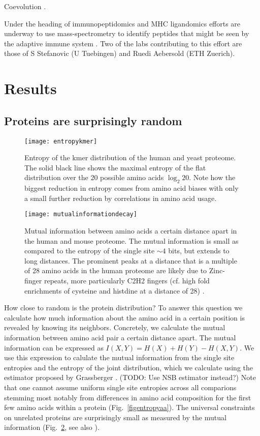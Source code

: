\documentclass[superscriptaddress,twocolumn,pre]{revtex4}
\newcommand{\<}{\langle}
\renewcommand{\>}{\rangle}
\begin{document}
Coevolution \cite{Bahir2009}.

Under the heading of immunopeptidomics and MHC ligandomics efforts are underway to use mass-spectrometry to identify peptides that might be seen by the adaptive immune system \cite{Abelin2017,Liepe2016}. Two of the labs contributing to this effort are those of S Stefanovic (U Tuebingen) and Ruedi Aebersold (ETH Zuerich).

\section{Results}


\subsection{Proteins are surprisingly random}

\begin{figure}
    \texttt{[image: entropykmer]}
    \caption{Entropy of the kmer distribution of the human and yeast proteome. The solid black line shows the maximal entropy of the flat distribution over the 20 possible amino acids $\log_2 20$. Note how the biggest reduction in entropy comes from amino acid biases with only a small further reduction by correlations in amino acid usage.
    \label{figentropykmer}
    }
\end{figure}


\begin{figure}
    \texttt{[image: mutualinformationdecay]}
    \caption{Mutual information between amino acids a certain distance apart in the human and mouse proteome. The mutual information is small as compared to the entropy of the single site $\sim 4$ bits, but extends to long distances. The prominent peaks at a distance that is a multiple of 28 amino acids in the human proteome are likely due to Zinc-finger repeats, more particularly C2H2 fingers (cf. high fold enrichments of cysteine and histdine at a distance of 28) \cite{Krishna2003}. 
    \label{figmutualinformationdecay}
    }
\end{figure}

How close to random is the protein distribution? To answer this question we calculate how much information about the amino acid in a certain position is revealed by knowing its neighbors. Concretely, we calculate the mutual information between amino acid pair a certain distance apart. The mutual information can be expressed as $I(X, Y) = H(X) + H(Y) - H(X, Y)$. We use this expression to calulate the mutual information from the single site entropies and the entropy of the joint distribution, which we calculate using the estimator proposed by Grassberger \cite{Grassberger2003}. (TODO: Use NSB estimator instead?) Note that one cannot assume uniform single site entropies across all comparions stemming most notably from differences in amino acid composition for the first few amino acids within a protein (Fig.~\ref{figentropyaa}). The universal constraints on unrelated proteins are surprisingly small as measured by the mutual information (Fig.~\ref{figmutualinformationdecay}, see also \cite{Lavelle2009}). 
\end{document}
